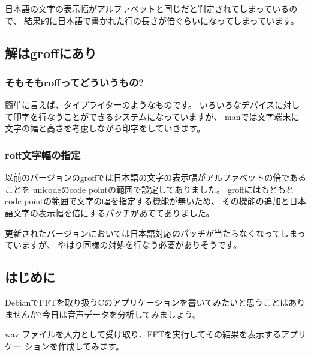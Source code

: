 \documentclass[mingoth,a4paper]{jsarticle}
\begin{document}
日本語の文字の表示幅がアルファベットと同じだと判定されてしまっているので、
結果的に日本語で書かれた行の長さが倍ぐらいになってしまっています。

\subsection{解はgroffにあり}

\subsubsection{そもそもroffってどういうもの?}

簡単に言えば、タイプライターのようなものです。
いろいろなデバイスに対して印字を行なうことができるシステムになっていますが、
manでは文字端末に文字の幅と高さを考慮しながら印字をしていきます。

\subsubsection{roff文字幅の指定}

以前のバージョンのgroffでは日本語の文字の表示幅がアルファベットの倍であることを
unicodeのcode pointの範囲で設定してありました。
groffにはもともとcode pointの範囲で文字の幅を指定する機能が無いため、
その機能の追加と日本語文字の表示幅を倍にするパッチがあててありました。

更新されたバージョンにおいては日本語対応のパッチが当たらなくなってしまっていますが、
やはり同様の対処を行なう必要がありそうです。



\subsection{はじめに}

DebianでFFTを取り扱うCのアプリケーションを書いてみたいと思うことはあり
ませんか?今日は音声データを分析してみましょう。

wav ファイルを入力として受け取り、FFTを実行してその結果を表示するアプリケー
ションを作成してみます。
\end{document}
